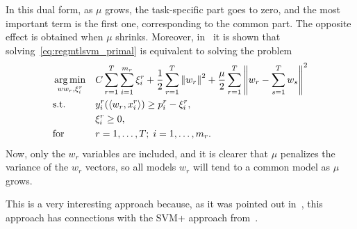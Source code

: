 In this dual form, as $\mu$ grows, the task-specific part goes to zero, and the most important term is the first one, corresponding to the common part. The opposite effect is obtained when $\mu$ shrinks.
Moreover, in~\cite{EvgeniouP04} it is shown that solving~\eqref{eq:regmtlsvm_primal} is equivalent to solving the problem
\begin{equation}
    \nonumber
    \begin{aligned}
        & \operatorname*{arg\min}_{ww_r, \xi_i^r}
        & & C \sum_{r=1}^T \sum_{i=1}^{m_r} \xi_i^r +  \frac{1}{2} \sum_{r=1}^T \left\lVert w_r\right\rVert^2 + \frac{\mu}{2} \sum_{r=1}^T  \left\lVert w_r - \sum_{s=1}^T w_s\right\rVert^2 \\
        & \text{s.t.}
        & & y_{i}^r ( \left\langle w_r, x_{i}^r \right\rangle) \geq p_i^r - \xi_i^r ,\\
        & & &\xi_i^r \geq 0, \\
        & \text{for } & & r=1, \ldots, T; \; i=1, \ldots, m_r.
    \end{aligned}
\end{equation}
Now, only the $w_r$ variables are included, and it is clearer that $\mu$ penalizes the variance of the $w_r$ vectors, so all models $w_r$ will tend to a common model as $\mu$ grows.

This is a very interesting approach because, as it was pointed out in~\cite{LiangC08}, this approach has connections with the SVM+ approach from~\cite{VapnikI15a}.


